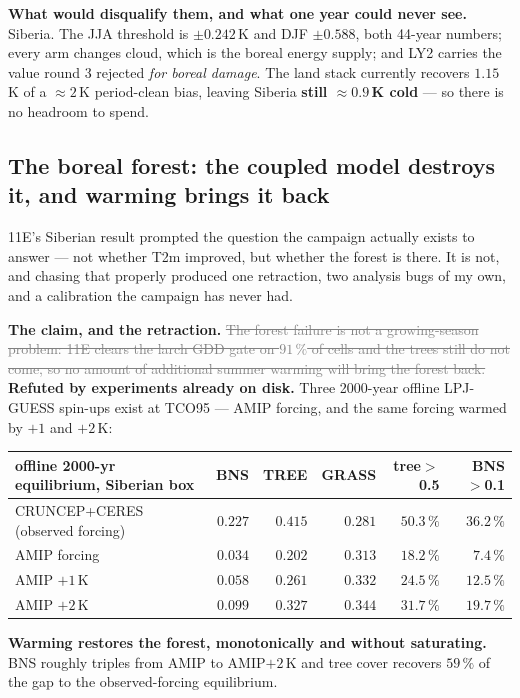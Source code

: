 \documentclass[10pt]{article}
\newcommand{\dead}[1]{\textcolor{gray}{\sout{#1}}}
\begin{document}
\textbf{What would disqualify them, and what one year could never see.} Siberia. The JJA
threshold is $\pm0.242$\,K and DJF $\pm0.588$, both 44-year numbers; every arm changes
cloud, which is the boreal energy supply; and LY2 carries the value round 3 rejected
\emph{for boreal damage}. The land stack currently recovers $1.15$\,K of a ${\approx}2$\,K
period-clean bias, leaving Siberia \textbf{still ${\approx}0.9$\,K cold} --- so there is no
headroom to spend.

\subsection{The boreal forest: the coupled model destroys it, and warming brings it
back}\label{sub:r27forest}
11E's Siberian result prompted the question the campaign actually exists to answer --- not
whether T2m improved, but whether the forest is there. It is not, and chasing that
properly produced one retraction, two analysis bugs of my own, and a calibration the
campaign has never had.

\textbf{The claim, and the retraction.}
\dead{The forest failure is not a growing-season problem: 11E clears the larch GDD gate on
$91\,\%$ of cells and the trees still do not come, so no amount of additional summer
warming will bring the forest back.}
\textbf{Refuted by experiments already on disk.} Three 2000-year offline LPJ-GUESS
spin-ups exist at TCO95 --- AMIP forcing, and the same forcing warmed by $+1$ and $+2$\,K:

\begin{center}\footnotesize
\begin{tabular}{l r r r r r}
\toprule
offline 2000-yr equilibrium, Siberian box & BNS & TREE & GRASS & tree$>$0.5 & BNS$>$0.1 \\
\midrule
CRUNCEP+CERES (observed forcing) & $0.227$ & $\mathbf{0.415}$ & $0.281$ & $50.3\,\%$ & $36.2\,\%$ \\
AMIP forcing & $0.034$ & $0.202$ & $0.313$ & $18.2\,\%$ & $7.4\,\%$ \\
AMIP $+1$\,K & $0.058$ & $0.261$ & $0.332$ & $24.5\,\%$ & $12.5\,\%$ \\
AMIP $+2$\,K & $\mathbf{0.099}$ & $\mathbf{0.327}$ & $0.344$ & $31.7\,\%$ & $19.7\,\%$ \\
\bottomrule
\end{tabular}
\end{center}

\noindent \textbf{Warming restores the forest, monotonically and without saturating.} BNS
roughly triples from AMIP to AMIP$+2$\,K and tree cover recovers $59\,\%$ of the gap to the
observed-forcing equilibrium.
\end{document}
